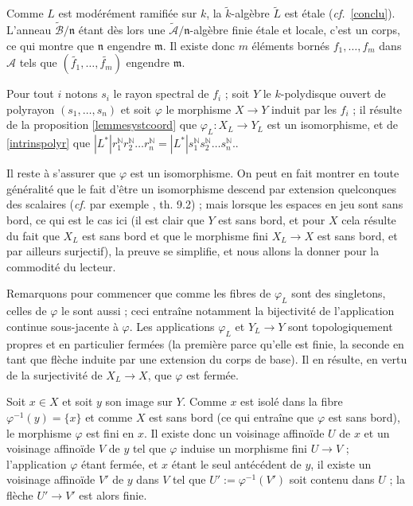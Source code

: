 \documentclass[10pt,leqno]{article}
\renewcommand{\phi}{\varphi}
\newcommand{\got}[1]{{\mathfrak #1}}
\renewcommand{\Bbb}{\mathbb}
\renewcommand{\cal}{\mathscr}
\newcommand{\NN}{{\Bbb N}}
\newcommand{\red}{\widetilde}
\begin{document}
\medskip
Comme $L$ est modérément ramifiée sur $k$, la $\red{k}$-algèbre $\red{L}$ est étale ({\em cf.}~\ref{conclu}). L'anneau $\red{\cal B}/\got{n}$ étant dès lors une $\red {\cal A}/\got{n}$-algèbre finie étale et locale, c'est un corps, ce qui montre que $\got{n}$ engendre $\got{m}$. Il existe donc $m$ éléments bornés $f_{1},\ldots,f_{m}$ dans $\cal A$ tels que $(\red{f_{1}},\ldots,\red{f_{m}})$ engendre $\got{m}$. 

\medskip
Pour tout $i$ notons $s_{i}$ le rayon spectral de $f_{i}$ ; soit $Y$ le $k$-polydisque ouvert de polyrayon $(s_1,\ldots,s_n)$ et soit $\phi$ le morphisme $X\to Y$ induit par les $f_i$ ; il résulte de la proposition \ref{lemmesystcoord} que $\phi_L: X_L\to Y_L$ est un isomorphisme, et de \ref{intrinspolyr} que $|L^*|r_1^{\NN}r_2^{\NN}\ldots r_n ^{\NN}=|L^*|s_1^{\NN}s_2^{\NN}\ldots s_n ^{\NN}.$.

\medskip
Il reste à s'assurer que $\phi$ est un isomorphisme. On peut en fait montrer en toute généralité que le fait d'être un isomorphisme descend par extension quelconques des scalaires ({\em cf.} par exemple \cite{cnrtmk}, th. 9.2) ; mais lorsque les espaces en jeu sont sans bord, ce qui est le cas ici (il est clair que $Y$ est sans bord, et pour $X$ cela résulte du fait que $X_L$ est sans bord et que le morphisme fini $X_L\to X$ est sans bord, et par ailleurs surjectif), la preuve se simplifie, et nous allons la donner pour la commodité du lecteur. 

\medskip
Remarquons pour commencer que comme les fibres de $\phi_{L}$ sont des singletons, celles de $\phi$ le sont aussi ; ceci entraîne notamment la bijectivité de l'application continue sous-jacente à $\phi$.  Les applications $\phi_L$ et $Y_L\to Y$ sont topologiquement propres et en particulier fermées (la première parce qu'elle est finie, la seconde en tant que flèche induite par une extension du corps de base). Il en résulte, en vertu de la surjectivité de $X_L\to X$, que $\phi$ est fermée. 

\medskip
Soit $x\in X$ et soit $y$ son image sur $Y$. Comme $x$ est isolé dans la fibre $\phi^{-1}(y)=\{x\}$ et comme $X$ est sans bord (ce qui entraîne que $\phi$ est sans bord), le morphisme $\phi$ est fini en $x$. Il existe donc un voisinage affinoïde $U$ de $x$ et un voisinage affinoïde $V$ de $y$ tel que $\phi$ induise un morphisme fini $U\to V$ ; l'application $\phi$ étant fermée, et $x$ étant le seul antécédent de $y$, il existe un voisinage affinoïde $V'$ de $y$ dans $V$ tel que $U':=\phi^{-1}(V')$ soit contenu dans $U$ ; la flèche $U'\to V'$ est alors finie. 
\end{document}
